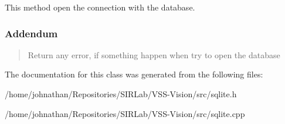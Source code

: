 This method open the connection with the database. 

\subsubsection*{Addendum }\begin{quote}
Return any error, if something happen when try to open the database \end{quote}


The documentation for this class was generated from the following files\+:\begin{DoxyCompactItemize}
\item 
/home/johnathan/\+Repositories/\+S\+I\+R\+Lab/\+V\+S\+S-\/\+Vision/src/sqlite.\+h\item 
/home/johnathan/\+Repositories/\+S\+I\+R\+Lab/\+V\+S\+S-\/\+Vision/src/sqlite.\+cpp\end{DoxyCompactItemize}
